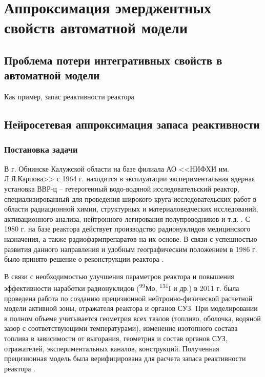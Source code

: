 \chapter{Аппроксимация эмерджентных свойств автоматной модели}

\section{Проблема потери интегративных свойств в автоматной модели}

Как пример, запас реактивности реактора
\cite{system-analysis}

\section{Нейросетевая аппроксимация запаса реактивности}

\subsection{Постановка задачи}

В г. Обнинске Калужской области на базе филиала АО <<НИФХИ им. Л.Я.Карпова>> с 1964 г. находится в эксплуатации экспериментальная ядерная установка ВВР-ц -- гетерогенный водо-водяной исследовательский реактор, специализированный для проведения широкого круга исследовательских работ в области радиационной химии, структурных и материаловедческих исследований, активационного анализа, нейтронного легирования полупроводников и т.д. \cite{wwrc-2008}. 
С 1980 г. на базе реактора действует производство радионуклидов медицинского назначения, а также радиофармпрепаратов на их основе. В связи с успешностью развития данного направления и удобным географическим положением в 1986 г. было принято решение о реконструкции реактора \cite{presice-model-2011}.

В связи с необходимостью улучшения параметров реактора и повышения эффективности наработки радионуклидов (\textsuperscript{99}Мо, \textsuperscript{131}I и др.) в 2011 г. была проведена работа по созданию прецизионной нейтронно-физической расчетной модели активной зоны, отражателя реактора и органов СУЗ. 
При моделировании в полном объеме учитывается геометрия всех твэлов (топливо, оболочка, водяной зазор с соответствующими температурами), изменение изотопного состава топлива в зависимости от выгорания, геометрия и состав органов СУЗ, отражателей, экспериментальных каналов, конструкций.
Полученная прецизионная модель была верифицирована для расчета запаса реактивности реактора \cite{presice-model-2011}.

